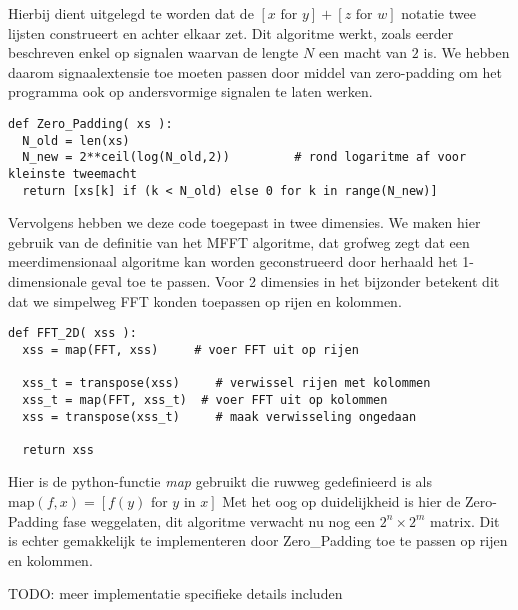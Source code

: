 Hierbij dient uitgelegd te worden dat de $[x \text{ for } y] + [z \text{ for } w]$ notatie twee lijsten construeert en achter elkaar zet. Dit algoritme werkt, zoals eerder beschreven enkel op signalen waarvan de lengte
$N$ een macht van $2$ is. We hebben daarom signaalextensie toe moeten passen door middel van zero-padding
om het programma ook op andersvormige signalen te laten werken.

\begin{lstlisting}[caption={Zero-Padding algoritme in Python, voegt nullen toe tot een tweemacht is bereikt}]
  def Zero_Padding( xs ):
  N_old = len(xs)
  N_new = 2**ceil(log(N_old,2))         # rond logaritme af voor kleinste tweemacht
  return [xs[k] if (k < N_old) else 0 for k in range(N_new)]
\end{lstlisting}

Vervolgens hebben we deze code toegepast in twee dimensies. We maken hier gebruik van de definitie van het
MFFT algoritme, dat grofweg zegt dat een meerdimensionaal algoritme kan worden geconstrueerd door herhaald
het 1-dimensionale geval toe te passen. Voor 2 dimensies in het bijzonder betekent dit dat we simpelweg
FFT konden toepassen op rijen en kolommen.

\begin{lstlisting}[caption=2-Dimensionaal FFT algoritme]
  def FFT_2D( xss ):
  xss = map(FFT, xss)     # voer FFT uit op rijen

  xss_t = transpose(xss)     # verwissel rijen met kolommen
  xss_t = map(FFT, xss_t)  # voer FFT uit op kolommen
  xss = transpose(xss_t)     # maak verwisseling ongedaan

  return xss
\end{lstlisting}
Hier is de python-functie \emph{map} gebruikt die ruwweg gedefinieerd is als
$\text{map}(f,x) = [f(y) \text{ for } y \text{ in } x]$
Met het oog op duidelijkheid is hier de Zero-Padding fase weggelaten,
dit algoritme verwacht nu nog een $2^n \times 2^m$ matrix.
Dit is echter gemakkelijk te implementeren door Zero\_Padding toe te passen op rijen en kolommen.

TODO: meer implementatie specifieke details includen